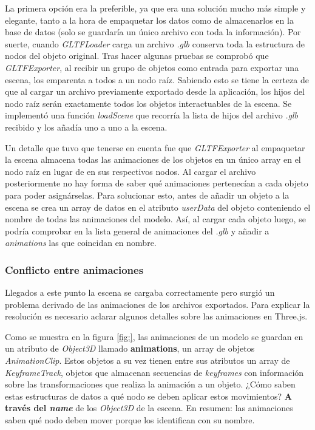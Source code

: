 La primera opción era la preferible, ya que era una solución mucho más simple y elegante, tanto a la hora de empaquetar los datos como de almacenarlos en la base de datos (solo se guardaría un único archivo con toda la información). Por suerte, cuando \textit{GLTFLoader} carga un archivo \textit{.glb} conserva toda la estructura de nodos del objeto original. Tras hacer algunas pruebas se comprobó que \textit{GLTFExporter}, al recibir un grupo de objetos como entrada para exportar una escena, los emparenta a todos a un nodo raíz. Sabiendo esto se tiene la certeza de que al cargar un archivo previamente exportado desde la aplicación, los hijos del nodo raíz serán exactamente todos los objetos interactuables de la escena. Se implementó una función \textit{loadScene} que recorría la lista de hijos del archivo \textit{.glb} recibido y los añadía uno a uno a la escena.

Un detalle que tuvo que tenerse en cuenta fue que \textit{GLTFExporter} al empaquetar la escena almacena todas las animaciones de los objetos en un único array en el nodo raíz en lugar de en sus respectivos nodos. Al cargar el archivo posteriormente no hay forma de saber qué animaciones pertenecían a cada objeto para poder asignárselas. Para solucionar esto, antes de añadir un objeto a la escena se crea un array de datos en el atributo \textit{userData} del objeto conteniendo el nombre de todas las animaciones del modelo. Así, al cargar cada objeto luego, se podría comprobar en la lista general de animaciones del \textit{.glb} y añadir a \textit{animations} las que coincidan en nombre.

\subsubsection{Conflicto entre animaciones}

Llegados a este punto la escena se cargaba correctamente pero surgió un problema derivado de las animaciones de los archivos exportados. Para explicar la resolución es necesario aclarar algunos detalles sobre las animaciones en Three.js.

Como se muestra en la figura \ref{fig:}, las animaciones de un modelo se guardan en un atributo de \textit{Object3D} llamado \textbf{animations}, un array de objetos \textit{AnimationClip}. Estos objetos a su vez tienen entre sus atributos un array de \textit{KeyframeTrack}, objetos que almacenan secuencias de \textit{keyframes} con información sobre las transformaciones que realiza la animación a un objeto. ¿Cómo saben estas estructuras de datos a qué nodo se deben aplicar estos movimientos? \textbf{A través del \textit{name}} de los \textit{Object3D} de la escena. En resumen: las animaciones saben qué nodo deben mover porque los identifican con su nombre.

